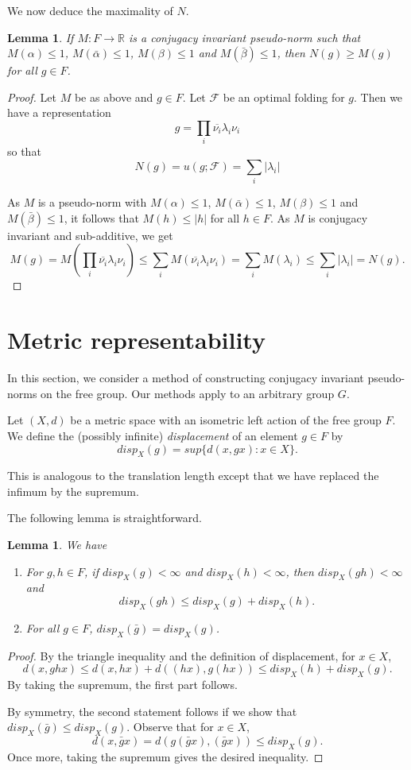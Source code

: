 \documentclass{amsart}
\theoremstyle{plain}
\newtheorem{lemma}[theorem]{Lemma}
\theoremstyle{definition}
\theoremstyle{remark}
\newcommand{\R}{\mathbb{R}}
\newcommand{\F}{\mathcal{F}}
\renewcommand{\a}{\alpha}
\renewcommand{\b}{\beta}
\newcommand{\ba}{\bar{\alpha}}
\newcommand{\bb}{\bar{\beta}}
\begin{document}
We now deduce the maximality of $N$.

\begin{lemma}\label{max}
If $M:F\to \R$ is a conjugacy invariant  pseudo-norm  such that $M(\a)\leq 1$, $M(\ba)\leq 1$, $M(\b)\leq 1$ and $M(\bb)\leq 1$, then $N(g)\geq M(g)$ for all $g\in F$.
\end{lemma}
\begin{proof}
Let $M$ be as above and $g\in F$. Let $\F$ be an optimal folding for $g$. Then we have a representation
$$g=\prod_i \overline{\nu_i}\lambda_i\nu_i$$
so that 
$$N(g)=u(g;\F)=\sum_i \vert \lambda_i\vert$$

As $M$ is a  pseudo-norm  with $M(\a)\leq 1$, $M(\ba)\leq 1$, $M(\b)\leq 1$ and $M(\bb)\leq 1$, it follows that $M(h)\leq\vert h\vert$ for all $h\in F$. As $M$ is conjugacy invariant and sub-additive, we get
$$M(g)=M(\prod_i \overline{\nu_i}\lambda_i\nu_i)\leq \sum_i M(\overline{\nu_i}\lambda_i\nu_i)= \sum_i M(\lambda_i)
\leq \sum_i\vert\lambda_i\vert=N(g).$$
\end{proof}

\section{Metric representability}\label{S:metric}

In this section, we consider a method of constructing conjugacy invariant  pseudo-norms on the free group. Our methods apply to an arbitrary group $G$.

Let $(X,d)$ be a metric space with an isometric left action of the free group $F$. We define the (possibly infinite) \emph{displacement} of an element $g\in F$ by
$$disp_X(g)=sup\{d(x,gx):x\in X\}.$$

This is analogous to the translation length except that we have replaced the infimum by the supremum. 
 
The following lemma is straightforward.

\begin{lemma}\label{subadd}
We have
\begin{enumerate}
\item For $g,h\in F$, if $disp_X(g)<\infty$ and $disp_X(h)<\infty$, then  $disp_X(gh)<\infty$ and 
$$disp_X(gh)\leq disp_X(g)+disp_X(h).$$ 
\item For all $g\in F$, $disp_X(\bar{g})=disp_X(g)$.
\end{enumerate}

\end{lemma}
\begin{proof}
By the triangle inequality and the definition of displacement, for $x\in X$,
$$d(x,ghx)\leq d(x,hx)+d((hx),g(hx))\leq disp_X(h)+disp_X(g).$$
By taking the supremum, the first part follows.

By symmetry, the second statement follows if we show that $disp_X(\bar{g})\leq disp_X(g)$. Observe that for $x\in X$,
$$d(x,\bar gx)=d(g(\bar g x) ,(\bar gx))\leq disp_X(g).$$
Once more, taking the supremum gives the desired inequality.
\end{proof}
\end{document}
